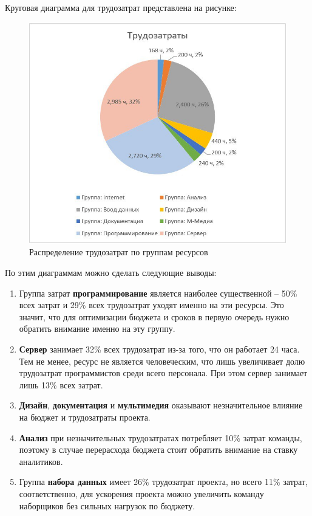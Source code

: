 \newpage
Круговая диаграмма для трудозатрат представлена на рисунке:
\FloatBarrier
\begin{figure}[h]	
	\begin{center}
		\includegraphics[width=\linewidth]{inc/4-2.jpg}
	\end{center}
	\captionsetup{justification=centering}
	\caption{Распределение трудозатрат по группам ресурсов}
\end{figure}
\FloatBarrier

По этим диаграммам можно сделать следующие выводы:
\begin{enumerate}
	\item Группа затрат \textbf{программирование} является наиболее существенной -- 50\% всех затрат и 29\% всех трудозатрат уходят именно на эти ресурсы. Это значит, что для оптимизации бюджета и сроков в первую очередь нужно обратить внимание именно на эту группу.
	\item \textbf{Сервер} занимает 32\% всех трудозатрат из-за того, что он работает 24 часа. Тем не менее, ресурс не является человеческим, что лишь увеличивает долю трудозатрат программистов среди всего персонала. При этом сервер занимает лишь 13\% всех затрат. 
	\item \textbf{Дизайн}, \textbf{документация} и \textbf{мультимедия} оказывают незначительное влияние на бюджет и трудозатраты проекта.
	\item \textbf{Анализ} при незначительных трудозатратах потребляет 10\% затрат команды, поэтому в случае перерасхода бюджета стоит обратить внимание на ставку аналитиков.
	\item Группа \textbf{набора данных} имеет 26\% трудозатрат проекта, но всего 11\% затрат, соответственно, для ускорения проекта можно увеличить команду наборщиков без сильных нагрузок по бюджету.
\end{enumerate}

